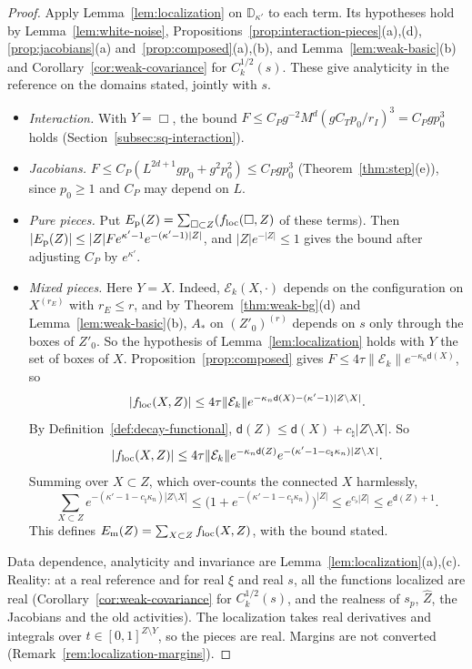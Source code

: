 \begin{proof}
Apply Lemma~\ref{lem:localization} on $\mathbb D_{\kappa'}$ to each term. Its hypotheses hold by Lemma~\ref{lem:white-noise}, Propositions~\ref{prop:interaction-pieces}(a),(d), \ref{prop:jacobians}(a) and~\ref{prop:composed}(a),(b), and Lemma~\ref{lem:weak-basic}(b) and Corollary~\ref{cor:weak-covariance} for $C_k^{1/2}(s)$. These give analyticity in the reference on the domains stated, jointly with $s$.
\begin{itemize}
\item \emph{Interaction.} With $Y=\Box$, the bound $F\le C_Pg^{-2}M^d(gC_Tp_0/r_I)^3=C_Pgp_0^3$ holds (Section~\ref{subsec:sq-interaction}).
\item \emph{Jacobians.} $F\le C_P(L^{2d+1}gp_0+g^2p_0^2)\le C_Pgp_0^3$ (Theorem~\ref{thm:step}(e)), since $p_0\ge1$ and $C_P$ may depend on $L$.
\item \emph{Pure pieces.} Put $E_{\rm p}(Z)=\sum_{\Box\subset Z}(f_{\rm loc}(\Box,Z)$ of these terms$)$. Then $|E_{\rm p}(Z)|\le|Z|F e^{\kappa'-1}e^{-(\kappa'-1)|Z|}$, and $|Z|e^{-|Z|}\le1$ gives the bound after adjusting $C_P$ by $e^{\kappa'}$.
\item \emph{Mixed pieces.} Here $Y=X$. Indeed, $\mathcal E_k(X,\cdot)$ depends on the configuration on $X^{(r_E)}$ with $r_E\le r$, and by Theorem~\ref{thm:weak-bg}(d) and Lemma~\ref{lem:weak-basic}(b), $A_*$ on $(Z'_0)^{(r)}$ depends on $s$ only through the boxes of $Z'_0$. So the hypothesis of Lemma~\ref{lem:localization} holds with $Y$ the set of boxes of $X$. Proposition~\ref{prop:composed} gives $F\le4\tau\|\mathcal E_k\|e^{-\kappa_n\mathsf d(X)}$, so
\[
|f_{\rm loc}(X,Z)|\le4\tau\|\mathcal E_k\|e^{-\kappa_n\mathsf d(X)-(\kappa'-1)|Z\setminus X|}.
\]
By Definition~\ref{def:decay-functional}, $\mathsf d(Z)\le\mathsf d(X)+c_\natural|Z\setminus X|$. So
\[
|f_{\rm loc}(X,Z)|\le4\tau\|\mathcal E_k\|e^{-\kappa_n\mathsf d(Z)}e^{-(\kappa'-1-c_\natural\kappa_n)|Z\setminus X|}.
\]
Summing over $X\subset Z$, which over-counts the connected $X$ harmlessly,
\[
\sum_{X\subset Z}e^{-(\kappa'-1-c_\natural\kappa_n)|Z\setminus X|}\le\big(1+e^{-(\kappa'-1-c_\natural\kappa_n)}\big)^{|Z|}\le e^{c_\flat|Z|}\le e^{\mathsf d(Z)+1}.
\]
This defines $E_{\rm m}(Z)=\sum_{X\subset Z}f_{\rm loc}(X,Z)$, with the bound stated.
\end{itemize}
Data dependence, analyticity and invariance are Lemma~\ref{lem:localization}(a),(c). Reality: at a real reference and for real $\xi$ and real $s$, all the functions localized are real (Corollary~\ref{cor:weak-covariance} for $C_k^{1/2}(s)$, and the realness of $s_p$, $\hat Z$, the Jacobians and the old activities). The localization takes real derivatives and integrals over $t\in[0,1]^{Z\setminus Y}$, so the pieces are real. Margins are not converted (Remark~\ref{rem:localization-margins}).
\end{proof}

